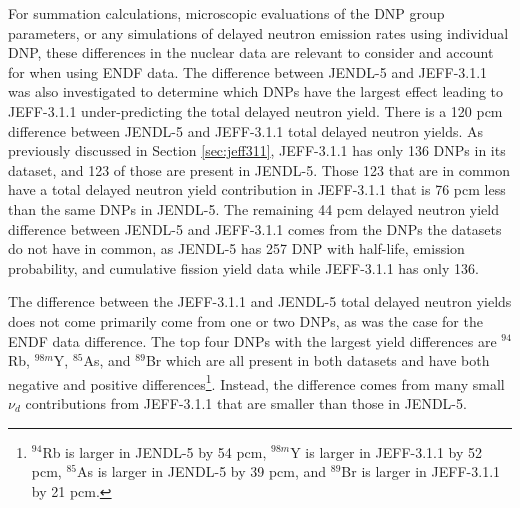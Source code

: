 For summation calculations, microscopic evaluations of the \gls{DNP} group parameters, or any simulations of delayed neutron emission rates using individual \gls{DNP}, these differences in the nuclear data are relevant to consider and account for when using ENDF data.
The difference between JENDL-5 and JEFF-3.1.1 was also investigated to determine which \glspl{DNP} have the largest effect leading to JEFF-3.1.1 under-predicting the total delayed neutron yield.
There is a 120 pcm difference between JENDL-5 and JEFF-3.1.1 total delayed neutron yields.
As previously discussed in Section \ref{sec:jeff311}, JEFF-3.1.1 has only 136 \glspl{DNP} in its dataset, and 123 of those are present in JENDL-5.
Those 123 that are in common have a total delayed neutron yield contribution in JEFF-3.1.1 that is 76 pcm less than the same \glspl{DNP} in JENDL-5.
The remaining 44 pcm delayed neutron yield difference between JENDL-5 and JEFF-3.1.1 comes from the \glspl{DNP} the datasets do not have in common, as JENDL-5 has 257 \gls{DNP} with half-life, emission probability, and cumulative fission yield data while JEFF-3.1.1 has only 136.

The difference between the JEFF-3.1.1 and JENDL-5 total delayed neutron yields does not come primarily come from one or two \glspl{DNP}, as was the case for the ENDF data difference.
The top four \glspl{DNP} with the largest yield differences are $^{94}$Rb, $^{98m}$Y, $^{85}$As, and $^{89}$Br which are all present in both datasets and have both negative and positive differences\footnote{$^{94}$Rb is larger in JENDL-5 by 54 pcm, $^{98m}$Y is larger in JEFF-3.1.1 by 52 pcm, $^{85}$As is larger in JENDL-5 by 39 pcm, and $^{89}$Br is larger in JEFF-3.1.1 by 21 pcm.}.
Instead, the difference comes from many small $\nu_d$ contributions from JEFF-3.1.1 that are smaller than those in JENDL-5.

